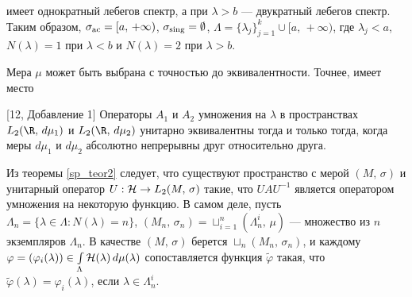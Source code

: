 \documentclass[a4paper
]{article}
\begin{document}
имеет однократный лебегов спектр, а при $\lambda>b$ --- двукратный
лебегов спектр. Таким образом, $\sigma_{{\rm ac}}=[a, \, +\infty)$,
$\sigma_{{\rm sing}}=\emptyset$, $\Lambda=\{\lambda_j\}_{j=1}^k\cup
[a, \, +\infty)$, где $\lambda_j<a$, $N(\lambda)=1$ при $\lambda<b$
и $N(\lambda)=2$ при $\lambda>b$. \par
Мера $\mu$ может быть выбрана с точностью до эквивалентности. Точнее,
имеет место
\begin{Trm}
\label{krit_unit_equiv_oper} {\rm [12, Добавление 1]}
Операторы $A_1$ и $A_2$ умножения на $\lambda$ в пространствах
$L_2(\R, \, d\mu_1)$ и $L_2(\R, \, d\mu_2)$ унитарно эквивалентны
тогда и только тогда, когда меры $d\mu_1$ и $d\mu_2$ абсолютно
непрерывны друг относительно друга.
\end{Trm}
Из теоремы \ref{sp_teor2} следует, что существуют пространство с мерой
$(M, \, \sigma)$ и унитарный оператор $U:{\cal H}\rightarrow L_2(M, \,
\sigma)$ такие, что $UAU^{-1}$ является оператором умножения на некоторую
функцию. В самом деле, пусть $\Lambda_n=\{\lambda\in \Lambda:N(\lambda)
=n\}$, $(M_n, \, \sigma_n)=\sqcup _{i=1}^n(\Lambda_n^i, \, \mu)$
--- множество из $n$ экземпляров $\Lambda_n$. В качестве $(M, \, \sigma)$
берется $\sqcup _n (M_n, \, \sigma_n)$, и каждому $\varphi=(\varphi_i
(\lambda))\in \int \limits_{\Lambda}{\cal H}(\lambda)\, d\mu(\lambda)$
сопоставляется функция $\tilde \varphi$ такая, что $\tilde \varphi(\lambda)
=\varphi_i(\lambda)$, если $\lambda\in \Lambda_n^i$.
\end{document}
